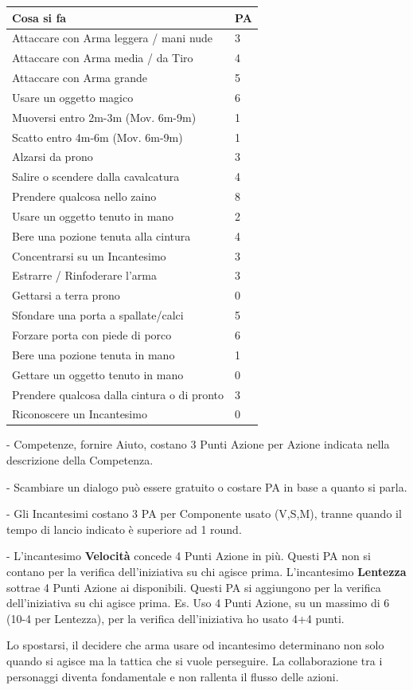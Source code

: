 \begin{multicols}{2}
\noindent\begin{tabular}{l|l}
\textbf{Cosa si fa} & \textbf{PA}\\
\toprule
Attaccare con Arma leggera / mani nude & 3 \\
Attaccare con Arma media / da Tiro & 4 \\
Attaccare con Arma grande & 5 \\
Usare un oggetto magico & 6 \\
Muoversi entro 2m-3m (Mov. 6m-9m) & 1 \\
Scatto entro 4m-6m (Mov. 6m-9m) & 1 \\
Alzarsi da prono & 3 \\
Salire o scendere dalla cavalcatura & 4 \\
Prendere qualcosa nello zaino & 8 \\
Usare un oggetto tenuto in mano & 2 \\
Bere una pozione tenuta alla cintura & 4 \\
Concentrarsi su un Incantesimo & 3 \\
Estrarre / Rinfoderare l'arma & 3 \\
Gettarsi a terra prono & 0 \\
Sfondare una porta a spallate/calci & 5 \\
Forzare porta con piede di porco & 6 \\
Bere una pozione tenuta in mano & 1 \\
Gettare un oggetto tenuto in mano & 0 \\
Prendere qualcosa dalla cintura o di pronto & 3 \\
Riconoscere un Incantesimo & 0 \\
\end{tabular}

\medskip

- Competenze, fornire Aiuto, costano 3 Punti Azione per Azione indicata nella descrizione della Competenza.

- Scambiare un dialogo può essere gratuito o costare PA in base a quanto si parla.

- Gli Incantesimi costano 3 PA per Componente usato (V,S,M), tranne quando il tempo di lancio indicato è superiore ad 1 round.

- L'incantesimo \textbf{Velocità} concede 4 Punti Azione in più. Questi PA non si contano per la verifica dell'iniziativa su chi agisce prima. L'incantesimo \textbf{Lentezza} sottrae 4 Punti Azione ai disponibili. Questi PA si aggiungono per la verifica dell'iniziativa su chi agisce prima. Es. Uso 4 Punti Azione, su un massimo di 6 (10-4 per Lentezza), per la verifica dell'iniziativa ho usato 4+4 punti.

Lo spostarsi, il decidere che arma usare od incantesimo determinano non solo quando si agisce ma la tattica che si vuole perseguire. La collaborazione tra i personaggi diventa fondamentale e non rallenta il flusso delle azioni.

\end{multicols}


